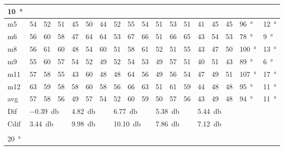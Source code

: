 \begin{table}[H]
\begin{tabular}{l|l|l|l|l|l|l|l|l|l|l|l|l|l|l|l|l|l}
\SI{10}{\degree}   & \multicolumn{3}{l|}{} & \multicolumn{3}{l|}{} & \multicolumn{3}{l|}{} & \multicolumn{3}{l|}{} &  \multicolumn{3}{l|}{}  &  \multicolumn{2}{l}{} \\  \hline
m5    & 54     & 52     & 51     &  45    & 50     &  44    &  52    & 55      &  54    &    51   &  53    &  51    & 41 & 45 & 45 &  \SI{96}{\degree} & \SI{12}{\degree} \\ 
m6    & 56     &  60    &  58    &  47    &  64    &  64    & 53     &  67     &   66   &    51   &    66  &   65   & 43 & 54 &53  & \SI{78}{\degree} & \SI{9}{\degree} \\ 
m8    & 56     &  61    & 60     & 48     &  54    & 60     & 51     & 58      &    61  &    52   &   51   &   55   & 43 & 47 & 50 & \SI{100}{\degree} & \SI{13}{\degree}  \\ 
m9    &  55    & 60     &  57    & 54     &   52   &  49    & 52     &  54     &   53   &     49  &    57  &   51   & 40 & 51 & 43 &  \SI{89}{\degree} & \SI{6}{\degree} \\ 
m11  &  57    & 58     &  55    &  43    &   60   &  48    & 48     &   64    &    56  &     49  &    56  &    54  & 47 & 49 & 51 &  \SI{107}{\degree} & \SI{17}{\degree} \\ 
m12  &  63    & 59     &  58    &  58    &  60    & 58     & 56     &   66    &    63  &    51   &    61  &  59    & 44 & 48 & 48&  \SI{95}{\degree} & \SI{11}{\degree} \\ \hline
avg &  57    & 58     &  56    &   49   &  57    & 54     &  52    &  60     & 59     &   50    &  57    &  56    & 43 & 49  & 48   &\SI{94}{\degree} & \SI{11}{\degree} \\ \hline  
Dif & \multicolumn{3}{l|}{\SI{-0.39}{\decibel}} & \multicolumn{3}{l|}{\SI{4.82}{\decibel}} & \multicolumn{3}{l|}{\SI{6.77}{\decibel}} & \multicolumn{3}{l|}{\SI{5.38}{\decibel}} &  \multicolumn{3}{l|}{\SI{5.44}{\decibel}} &  \multicolumn{2}{l}{}  \\ \hline 
Cdif & \multicolumn{3}{l|}{\SI{3.44}{\decibel}} & \multicolumn{3}{l|}{\SI{9.98}{\decibel}} & \multicolumn{3}{l|}{\SI{10.10}{\decibel}} & \multicolumn{3}{l|}{\SI{7.86}{\decibel}} & \multicolumn{3}{l|}{\SI{7.12}{\decibel}}  &   \multicolumn{2}{l}{}   \\ 
 \multicolumn{18}{l}{ } \\                             
\SI{20}{\degree}   & \multicolumn{3}{l|}{} & \multicolumn{3}{l|}{} & \multicolumn{3}{l|}{} & \multicolumn{3}{l|}{} &  \multicolumn{3}{l|}{}  &  \multicolumn{2}{l}{}  \\  \hline

\end{tabular}
\end{table}
